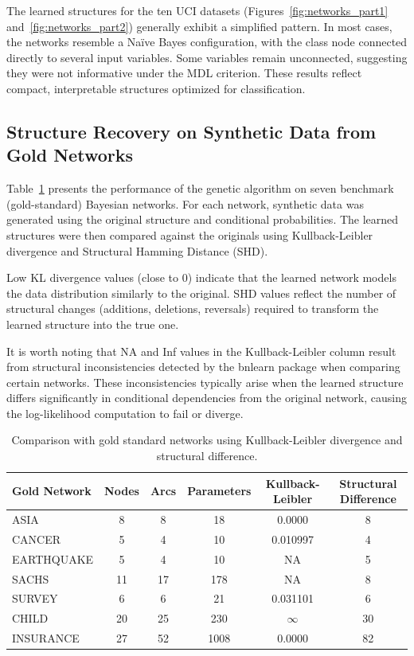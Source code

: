 \documentclass[runningheads]{llncs}
\begin{document}
The learned structures for the ten UCI datasets (Figures~\ref{fig:networks_part1} and~\ref{fig:networks_part2}) generally exhibit a simplified pattern. In most cases, the networks resemble a Naïve Bayes configuration, with the class node connected directly to several input variables. Some variables remain unconnected, suggesting they were not informative under the MDL criterion. These results reflect compact, interpretable structures optimized for classification.



\newpage

\subsection{Structure Recovery on Synthetic Data from Gold Networks}

Table~\ref{tab:gold_networks} presents the performance of the genetic algorithm on seven benchmark (gold-standard) Bayesian networks. For each network, synthetic data was generated using the original structure and conditional probabilities. The learned structures were then compared against the originals using Kullback-Leibler divergence and Structural Hamming Distance (SHD).

Low KL divergence values (close to 0) indicate that the learned network models the data distribution similarly to the original. SHD values reflect the number of structural changes (additions, deletions, reversals) required to transform the learned structure into the true one.

It is worth noting that NA and Inf values in the Kullback-Leibler column result from structural inconsistencies detected by the bnlearn package when comparing certain networks. These inconsistencies typically arise when the learned structure differs significantly in conditional dependencies from the original network, causing the log-likelihood computation to fail or diverge.

\begin{table}[htbp]
	\centering
	\caption{Comparison with gold standard networks using Kullback-Leibler divergence and structural difference.}
	\begin{tabular}{lccccc}
		\hline
		\textbf{Gold Network} & \textbf{Nodes} & \textbf{Arcs} & \textbf{Parameters} & \textbf{Kullback-Leibler} & \textbf{Structural Difference} \\
		\hline
		ASIA       & 8  & 8  & 18   & 0.0000       & 8  \\
		CANCER     & 5  & 4  & 10   & 0.010997     & 4  \\
		EARTHQUAKE & 5  & 4  & 10   & NA           & 5  \\
		SACHS      & 11 & 17 & 178  & NA           & 8  \\
		SURVEY     & 6  & 6  & 21   & 0.031101     & 6  \\
		CHILD      & 20 & 25 & 230  & $\infty$     & 30 \\
		INSURANCE  & 27 & 52 & 1008 & 0.0000       & 82 \\
		\hline
	\end{tabular}
	\label{tab:gold_networks}
\end{table}
\end{document}
